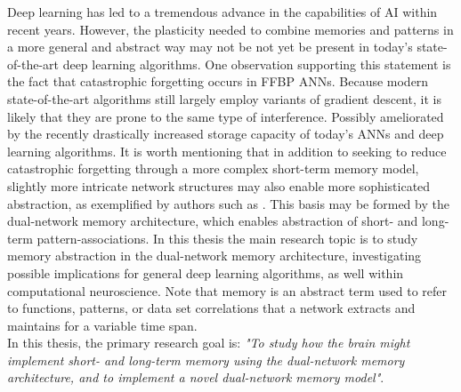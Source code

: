 Deep learning has led to a tremendous advance in the capabilities of AI within recent years. However, the plasticity needed to combine memories and patterns in a more general and abstract way may not be not yet be present in today's state-of-the-art deep learning algorithms. One observation supporting this statement is the fact that catastrophic forgetting occurs in FFBP ANNs. Because modern state-of-the-art algorithms still largely employ variants of gradient descent, it is likely that they are prone to the same type of interference. Possibly ameliorated by the recently drastically increased storage capacity of today's ANNs and deep learning algorithms.
It is worth mentioning that in addition to seeking to reduce catastrophic forgetting through a more complex short-term memory model, slightly more intricate network structures may also enable more sophisticated abstraction, as exemplified by authors such as \cite{Tani2014}. This basis may be formed by the dual-network memory architecture, which enables abstraction of short- and long-term pattern-associations.
In this thesis the main research topic is to study memory abstraction in the dual-network memory architecture, investigating possible implications for general deep learning algorithms, as well within computational neuroscience. Note that memory is an abstract term used to refer to functions, patterns, or data set correlations that a network extracts and maintains for a variable time span.
\\

In this thesis, 
the primary research goal is: \textit{"To study how the brain might implement short- and long-term memory using the dual-network memory architecture, and to implement a novel dual-network memory model"}.
\\

